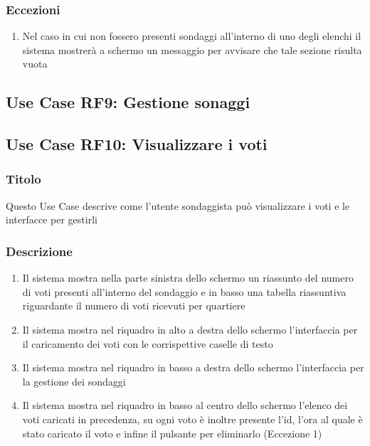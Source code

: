         \subsubsection{Eccezioni}
            \begin{enumerate}
                \item Nel caso in cui non fossero presenti sondaggi all'interno di uno degli elenchi il sistema mostrerà a schermo un messaggio per avvisare che tale sezione risulta vuota
            \end{enumerate}

    \subsection{Use Case RF9: Gestione sonaggi}

    \subsection{Use Case RF10: Visualizzare i voti}
        \subsubsection{Titolo}
            Questo Use Case descrive come l'utente sondaggista può visualizzare i voti e le interfacce per gestirli
        \subsubsection{Descrizione}
            \begin{enumerate}
                \item Il sistema mostra nella parte sinistra dello schermo un riassunto del numero di voti presenti all'interno del sondaggio e in basso una tabella riassuntiva riguardante il numero di voti ricevuti per quartiere
                \item Il sistema mostra nel riquadro in alto a destra dello schermo l'interfaccia per il caricamento dei voti con le corrispettive caselle di testo
                \item Il sistema mostra nel riquadro in basso a destra dello schermo l'interfaccia per la gestione dei sondaggi
                \item Il sistema mostra nel riquadro in basso al centro dello schermo l'elenco dei voti caricati in precedenza, su ogni voto è inoltre presente l'id, l'ora al quale è stato caricato il voto e infine il pulsante per eliminarlo (Eccezione 1)
            \end{enumerate}

